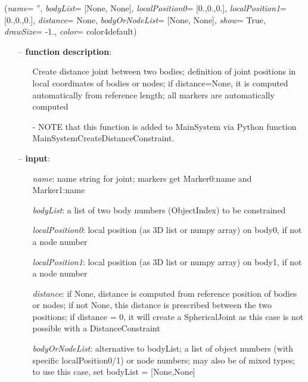 %
\begin{flushleft}
\label{sec:mainsystemextensions:CreateDistanceConstraint}
({\it name}= '', {\it bodyList}= [None, None], {\it localPosition0}= [0.,0.,0.], {\it localPosition1}= [0.,0.,0.], {\it distance}= None, {\it bodyOrNodeList}= [None, None], {\it show}= True, {\it drawSize}= -1., {\it color}= color4default)
\end{flushleft}
\setlength{\itemindent}{0.7cm}
\begin{itemize}[leftmargin=0.7cm]
\item[--]
{\bf function description}: \vspace{-6pt}
\begin{itemize}[leftmargin=1.2cm]
\setlength{\itemindent}{-0.7cm}
\item[]Create distance joint between two bodies; definition of joint positions in local coordinates of bodies or nodes; if distance=None, it is computed automatically from reference length; all markers are automatically computed
\item[]- NOTE that this function is added to MainSystem via Python function MainSystemCreateDistanceConstraint.
\end{itemize}
\item[--]
{\bf input}: \vspace{-6pt}
\begin{itemize}[leftmargin=1.2cm]
\setlength{\itemindent}{-0.7cm}
\item[]{\it name}: name string for joint; markers get Marker0:name and Marker1:name
\item[]{\it bodyList}: a list of two body numbers (ObjectIndex) to be constrained
\item[]{\it localPosition0}: local position (as 3D list or numpy array) on body0, if not a node number
\item[]{\it localPosition1}: local position (as 3D list or numpy array) on body1, if not a node number
\item[]{\it distance}: if None, distance is computed from reference position of bodies or nodes; if not None, this distance is prescribed between the two positions; if distance = 0, it will create a SphericalJoint as this case is not possible with a DistanceConstraint
\item[]{\it bodyOrNodeList}: alternative to bodyList; a list of object numbers (with specific localPosition0/1) or node numbers; may also be of mixed types; to use this case, set bodyList = [None,None]

\end{itemize}
\end{itemize}
